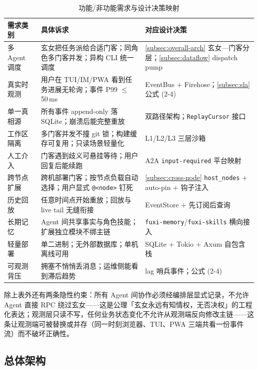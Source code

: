 \begin{table}[H]
\centering
\caption{功能/非功能需求与设计决策映射}
\label{tab:requirement-design-mapping}
\small
\begin{tabularx}{\textwidth}{p{2.6cm} X p{4.0cm}}
\toprule
\textbf{需求类别} & \textbf{具体诉求} & \textbf{对应设计决策} \\
\midrule
多 Agent 调度 & 玄女把任务派给合适门客；同角色多门客并发；异构 CLI 统一调度 & \autoref{subsec:overall-arch} 玄女—门客分层；\autoref{subsec:dataflow} dispatch pump \\
\addlinespace
真实时观测 & 用户在 TUI/IM/PWA 看到任务进展无轮询；事件 P99 $\le$ 50\,ms & EventBus + Firehose；\autoref{subsec:sla} 公式 (2-4) \\
\addlinespace
单一真相源 & 所有事件 append-only 落 SQLite；崩溃后能完整重放 & 双路径架构；\texttt{ReplayCursor} 接口 \\
\addlinespace
工作区隔离 & 多门客并发不撞 git 锁；构建缓存可复用；只读场景轻量化 & L1/L2/L3 三层沙箱 \\
\addlinespace
人工介入 & 门客遇到歧义可悬挂等待；用户回复后能续跑 & A2A \texttt{input-required} 平台映射 \\
\addlinespace
跨节点扩展 & 跨机部署门客；按节点负载自动选择；用户显式 \texttt{@<node>} 钉死 & \autoref{subsec:cross-node} \texttt{host\_nodes} + auto-pin + 钩子注入 \\
\addlinespace
历史回放 & 任意时间点开始重放；回放与 live tail 无缝衔接 & EventStore + 先订阅后查询 \\
\addlinespace
长期记忆 & Agent 间共享事实与角色技能；扩展独立模块不绑主链 & \texttt{fuxi-memory}/\texttt{fuxi-skills} 横向接入 \\
\addlinespace
轻量部署 & 单二进制；无外部数据库；单机离线可用 & SQLite + Tokio + Axum 自包含栈 \\
\addlinespace
可观测背压 & 拥塞不悄悄丢消息；运维侧能看到滞后趋势 & lag 哨兵事件；公式 (2-4) \\
\bottomrule
\end{tabularx}
\end{table}

除上表外还有两条隐性约束：所有 Agent 间协作必须经编排层显式记录，不允许 Agent 直接 RPC 绕过玄女——这是公理「玄女永远有知情权，无否决权」的工程化表达；观测层只读不写，任何业务状态变化不允许从观测端反向修改主链——这条让观测端可被替换或并存（同一时刻浏览器、TUI、PWA 三端共看一份事件流）而不破坏正确性。

\subsection{总体架构}
\label{subsec:overall-arch}


